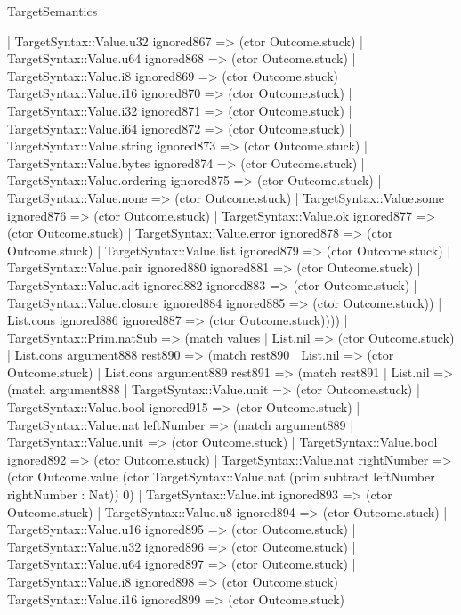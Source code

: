 \begin{lexlean}{TargetSemantics}
\begin{semanticmodule}
{            | TargetSyntax::Value.u32 ignored867 => (ctor Outcome.stuck)
            | TargetSyntax::Value.u64 ignored868 => (ctor Outcome.stuck)
            | TargetSyntax::Value.i8 ignored869 => (ctor Outcome.stuck)
            | TargetSyntax::Value.i16 ignored870 => (ctor Outcome.stuck)
            | TargetSyntax::Value.i32 ignored871 => (ctor Outcome.stuck)
            | TargetSyntax::Value.i64 ignored872 => (ctor Outcome.stuck)
            | TargetSyntax::Value.string ignored873 => (ctor Outcome.stuck)
            | TargetSyntax::Value.bytes ignored874 => (ctor Outcome.stuck)
            | TargetSyntax::Value.ordering ignored875 => (ctor Outcome.stuck)
            | TargetSyntax::Value.none => (ctor Outcome.stuck)
            | TargetSyntax::Value.some ignored876 => (ctor Outcome.stuck)
            | TargetSyntax::Value.ok ignored877 => (ctor Outcome.stuck)
            | TargetSyntax::Value.error ignored878 => (ctor Outcome.stuck)
            | TargetSyntax::Value.list ignored879 => (ctor Outcome.stuck)
            | TargetSyntax::Value.pair ignored880 ignored881 => (ctor Outcome.stuck)
            | TargetSyntax::Value.adt ignored882 ignored883 => (ctor Outcome.stuck)
            | TargetSyntax::Value.closure ignored884 ignored885 => (ctor Outcome.stuck))
          | List.cons ignored886 ignored887 => (ctor Outcome.stuck))))
    | TargetSyntax::Prim.natSub => (match values
      | List.nil => (ctor Outcome.stuck)
      | List.cons argument888 rest890 => (match rest890
        | List.nil => (ctor Outcome.stuck)
        | List.cons argument889 rest891 => (match rest891
          | List.nil => (match argument888
            | TargetSyntax::Value.unit => (ctor Outcome.stuck)
            | TargetSyntax::Value.bool ignored915 => (ctor Outcome.stuck)
            | TargetSyntax::Value.nat leftNumber => (match argument889
              | TargetSyntax::Value.unit => (ctor Outcome.stuck)
              | TargetSyntax::Value.bool ignored892 => (ctor Outcome.stuck)
              | TargetSyntax::Value.nat rightNumber => (ctor Outcome.value (ctor TargetSyntax::Value.nat (prim subtract leftNumber rightNumber : Nat)) 0)
              | TargetSyntax::Value.int ignored893 => (ctor Outcome.stuck)
              | TargetSyntax::Value.u8 ignored894 => (ctor Outcome.stuck)
              | TargetSyntax::Value.u16 ignored895 => (ctor Outcome.stuck)
              | TargetSyntax::Value.u32 ignored896 => (ctor Outcome.stuck)
              | TargetSyntax::Value.u64 ignored897 => (ctor Outcome.stuck)
              | TargetSyntax::Value.i8 ignored898 => (ctor Outcome.stuck)
              | TargetSyntax::Value.i16 ignored899 => (ctor Outcome.stuck)
}
\end{semanticmodule}
\end{lexlean}

